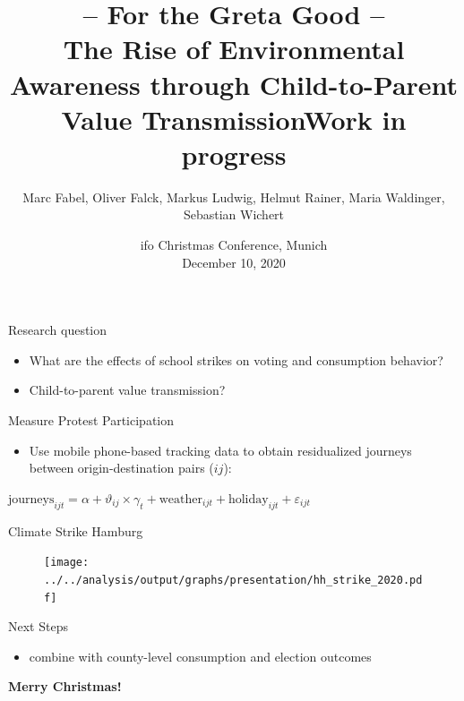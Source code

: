 \documentclass[usenames,dvipsnames]{beamer} %
\title[Soccer and Crime]{  \textbf{-- For the Greta Good -- \\ The Rise of Environmental Awareness through Child-to-Parent Value Transmission}\newline Work in progress}
\author[Marc Fabel]{Marc Fabel, Oliver Falck, Markus Ludwig, Helmut Rainer, Maria Waldinger, Sebastian Wichert}
\date{ifo Christmas Conference, Munich\\December 10, 2020}
\begin{document}
\begin{frame}
	\titlepage
\end{frame}








\begin{frame}
	\begin{block}{Research question}
		\begin{itemize}
			\item What are the effects of school strikes on voting and consumption behavior?
			\item Child-to-parent value transmission?
		\end{itemize}
	\end{block}

	\begin{block}{Measure Protest Participation}
		\begin{itemize}
			\item Use mobile phone-based tracking data to obtain residualized journeys between origin-destination pairs ($ij$): 		
			
		\end{itemize}
	$\text{journeys}_{ijt} = \alpha + \vartheta_{ij} \times \gamma_t + \text{weather}_{ijt} + \text{holiday}_{ijt} + \varepsilon_{ijt} $
	\end{block}	
\end{frame}





\begin{frame}{Climate Strike Hamburg}
	\begin{figure}
		\texttt{[image: ../../analysis/output/graphs/presentation/hh\_strike\_2020.pdf]}
	\end{figure}
\end{frame}


\begin{frame}
	\begin{block}{Next Steps}
		\begin{itemize}
			\item combine with county-level consumption and election outcomes\pause
		\end{itemize}
	\end{block}

	\begin{center}
		\textbf{Merry Christmas!}
	\end{center}

\end{frame}
\end{document}
